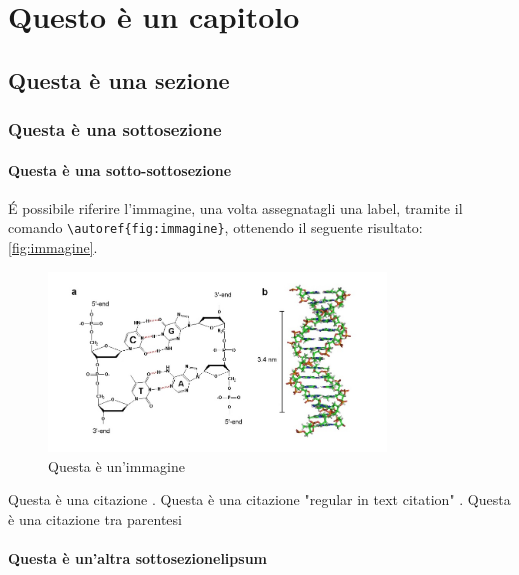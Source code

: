 \chapter{Questo è un capitolo}

\lipsum[1]

\section{Questa è una sezione}

\lipsum[2]

\subsection{Questa è una sottosezione}

\lipsum[3]

\subsubsection{Questa è una sotto-sottosezione}

\lipsum[4]

É possibile riferire l'immagine, una volta assegnatagli una label, tramite il comando \texttt{\textbackslash autoref\{fig:immagine\}}, ottenendo il seguente risultato: \autoref{fig:immagine}.

\begin{figure}
    \centering
    \includegraphics[width= 0.8\textwidth]{images/Capitolo1/immagine.jpg} 
    \caption{Questa è un'immagine} 
    \label{fig:immagine}
\end{figure}

Questa è una citazione \cite{warstadt2020blimp}.
Questa è una citazione "regular in text citation" \citet{warstadt2020blimp}.  %
Questa è una citazione tra parentesi \citep{warstadt2020blimp}

\subsubsection{Questa è un'altra sottosezionelipsum}

